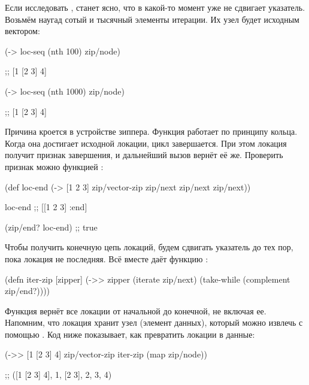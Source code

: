 Если исследовать , станет ясно, что в какой-то момент  уже не
сдвигает указатель. Возьмём наугад сотый и тысячный элементы итерации. Их узел
будет исходным вектором:

\begin{english}
  \begin{clojure}
(-> loc-seq (nth 100) zip/node)

;; [1 [2 3] 4]

(-> loc-seq (nth 1000) zip/node)

;; [1 [2 3] 4]

  \end{clojure}
\end{english}

Причина кроется в устройстве зиппера. Функция  работает по принципу
кольца. Когда она достигает исходной локации, цикл завершается. При этом локация
получит признак завершения, и дальнейший вызов  вернёт её
же. Проверить признак можно функцией :


\begin{english}
  \begin{clojure}
(def loc-end
  (-> [1 2 3]
      zip/vector-zip
      zip/next
      zip/next
      zip/next))

loc-end
;; [[1 2 3] :end]

(zip/end? loc-end)
;; true

  \end{clojure}
\end{english}

Чтобы получить конечную цепь локаций, будем сдвигать указатель до тех пор, пока
локация не последняя. Всё вместе даёт функцию :

\begin{english}
  \begin{clojure}
(defn iter-zip [zipper]
  (->> zipper
       (iterate zip/next)
       (take-while (complement zip/end?))))
  \end{clojure}
\end{english}

Функция вернёт все локации от начальной до конечной, не включая ее. Напомним, что
локация хранит узел (элемент данных), который можно извлечь с помощью
. Код ниже показывает, как превратить локации в данные:

\begin{english}
  \begin{clojure}
(->> [1 [2 3] 4]
     zip/vector-zip
     iter-zip
     (map zip/node))

;; ([1 [2 3] 4], 1, [2 3], 2, 3, 4)
  \end{clojure}
\end{english}

